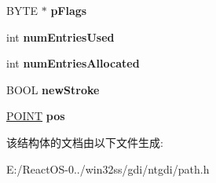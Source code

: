 \begin{DoxyCompactItemize}
\item 
\mbox{\label{struct___p_a_t_h_a68cf93ae012cb0770b73dab586c7de73}} 
B\+Y\+TE $\ast$ {\bfseries p\+Flags}
\item 
\mbox{\label{struct___p_a_t_h_a826cede991947c0794672c2c283698d3}} 
int {\bfseries num\+Entries\+Used}
\item 
\mbox{\label{struct___p_a_t_h_aae5b7ed6c4016211517f4002a1b8abf8}} 
int {\bfseries num\+Entries\+Allocated}
\item 
\mbox{\label{struct___p_a_t_h_a183c90557cb32188f79fb90b1290920f}} 
B\+O\+OL {\bfseries new\+Stroke}
\item 
\mbox{\label{struct___p_a_t_h_a337d3347c2461d55af2b09cc71eeb0cc}} 
\hyperlink{structtag_p_o_i_n_t}{P\+O\+I\+NT} {\bfseries pos}
\end{DoxyCompactItemize}


该结构体的文档由以下文件生成\+:\begin{DoxyCompactItemize}
\item 
E\+:/\+React\+O\+S-\/0../win32ss/gdi/ntgdi/path.\+h\end{DoxyCompactItemize}
